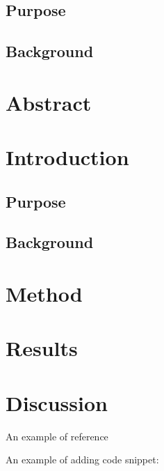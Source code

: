 \documentclass{article}
\begin{document}
\subsection{Purpose}

\subsection{Background}



\tableofcontents
\large

\thispagestyle{empty} 


\newpage 

\section*{Abstract}
\newpage




\section{Introduction}
\vspace{1cm}


\subsection{Purpose}
\subsection{Background}
\section{Method}

\vspace{2cm}


\section{Results}
\newpage


\section{Discussion}

\vspace{0.6cm}
An example of reference \cite{example}\\ %
\vspace{5cm}

An example of adding code snippet:
\vspace{0.6cm}
\end{document}
